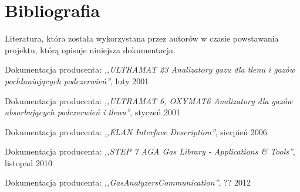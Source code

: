 \section{Bibliografia}
Literatura, która została wykorzystana przez autorów w czasie powstawania projektu, którą opisuje niniejsza dokumentacja.

\begin{thebibliography}{9}
Dokumentacja producenta: 
\emph{,,ULTRAMAT 23 Analizatory gazu dla tlenu i gazów pochłaniających podczerwień''}, 
luty 2001

Dokumentacja producenta: 
\emph{,,ULTRAMAT 6, OXYMAT6 Analizatory dla gazów absorbujących podczerwień i tlenu''}, 
styczeń 2001

Dokumentacja producenta: 
\emph{,,ELAN Interface Description''}, 
sierpień 2006

Dokumentacja producenta: 
\emph{,,STEP 7 AGA Gas Library - Applications & Tools''}, 
listopad 2010

Dokumentacja producenta: 
\emph{,,GasAnalyzersCommunication''}, 
?? 2012

\end{thebibliography}